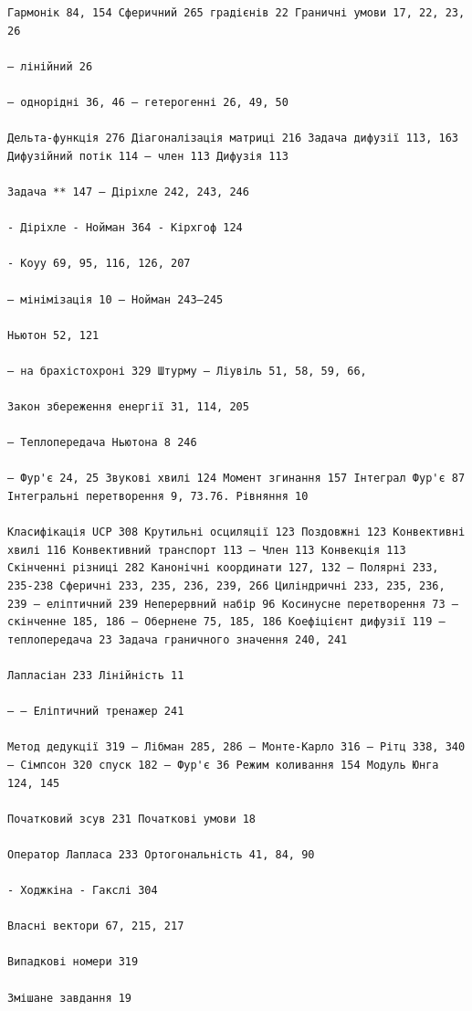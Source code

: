 \documentclass[
  ukrainian,
]{article}
\begin{document}
\begin{verbatim}
Гармонік 84, 154 Сферичний 265 градієнів 22 Граничні умови 17, 22, 23, 26

— лінійний 26

— однорідні 36, 46 — гетерогенні 26, 49, 50

Дельта-функція 276 Діагоналізація матриці 216 Задача дифузії 113, 163 Дифузійний потік 114 — член 113 Дифузія 113

Задача ** 147 – Діріхле 242, 243, 246

- Діріхле - Нойман 364 - Кірхгоф 124

- Коуу 69, 95, 116, 126, 207

— мінімізація 10 — Нойман 243—245

Ньютон 52, 121

— на брахістохроні 329 Штурму — Ліувіль 51, 58, 59, 66,

Закон збереження енергії 31, 114, 205

— Теплопередача Ньютона 8 246

— Фур'є 24, 25 Звукові хвилі 124 Момент згинання 157 Інтеграл Фур'є 87 Інтегральні перетворення 9, 73.76. Рівняння 10

Класифікація UCP 308 Крутильні осциляції 123 Поздовжні 123 Конвективні хвилі 116 Конвективний транспорт 113 — Член 113 Конвекція 113 Скінченні різниці 282 Канонічні координати 127, 132 — Полярні 233, 235-238 Сферичні 233, 235, 236, 239, 266 Циліндричні 233, 235, 236, 239 — еліптичний 239 Неперервний набір 96 Косинусне перетворення 73 — скінченне 185, 186 — Обернене 75, 185, 186 Коефіцієнт дифузії 119 — теплопередача 23 Задача граничного значення 240, 241

Лапласіан 233 Лінійність 11

— — Еліптичний тренажер 241

Метод дедукції 319 – Лібман 285, 286 – Монте-Карло 316 – Рітц 338, 340 – Сімпсон 320 спуск 182 – Фур'є 36 Режим коливання 154 Модуль Юнга 124, 145

Початковий зсув 231 Початкові умови 18

Оператор Лапласа 233 Ортогональність 41, 84, 90

- Ходжкіна - Гакслі 304

Власні вектори 67, 215, 217

Випадкові номери 319

Змішане завдання 19


\end{verbatim}
\end{document}
